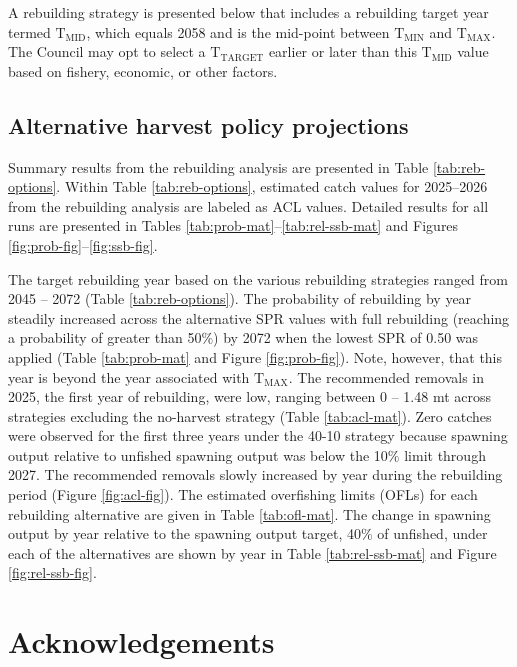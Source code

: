 \documentclass[11pt,
  letterpaper,
]{article}
\begin{document}
A rebuilding strategy is presented below that includes a rebuilding target year termed \(\text{T}_\text{MID}\), which equals 2058 and is the mid-point between \(\text{T}_\text{MIN}\) and \(\text{T}_\text{MAX}\). The Council may opt to select a \(\text{T}_\text{TARGET}\) earlier or later than this \(\text{T}_\text{MID}\) value based on fishery, economic, or other factors.

\hypertarget{alternative-harvest-policy-projections}{%
\subsection{Alternative harvest policy projections}\label{alternative-harvest-policy-projections}}

Summary results from the rebuilding analysis are presented in Table \ref{tab:reb-options}. Within Table \ref{tab:reb-options}, estimated catch values for 2025--2026 from the rebuilding analysis are labeled as ACL values. Detailed results for all runs are presented in Tables \ref{tab:prob-mat}--\ref{tab:rel-ssb-mat} and Figures \ref{fig:prob-fig}--\ref{fig:ssb-fig}.

The target rebuilding year based on the various rebuilding strategies ranged from 2045 -- 2072 (Table \ref{tab:reb-options}). The probability of rebuilding by year steadily increased across the alternative SPR values with full rebuilding (reaching a probability of greater than 50\(\%\)) by 2072 when the lowest SPR of 0.50 was applied (Table \ref{tab:prob-mat} and Figure \ref{fig:prob-fig}). Note, however, that this year is beyond the year associated with \(\text{T}_\text{MAX}\). The recommended removals in 2025, the first year of rebuilding, were low, ranging between 0 -- 1.48 mt across strategies excluding the no-harvest strategy (Table \ref{tab:acl-mat}). Zero catches were observed for the first three years under the 40-10 strategy because spawning output relative to unfished spawning output was below the 10\(\%\) limit through 2027. The recommended removals slowly increased by year during the rebuilding period (Figure \ref{fig:acl-fig}). The estimated overfishing limits (OFLs) for each rebuilding alternative are given in Table \ref{tab:ofl-mat}. The change in spawning output by year relative to the spawning output target, 40\(\%\) of unfished, under each of the alternatives are shown by year in Table \ref{tab:rel-ssb-mat} and Figure \ref{fig:rel-ssb-fig}.

\hypertarget{acknowledgements}{%
\section{Acknowledgements}\label{acknowledgements}}
\end{document}
